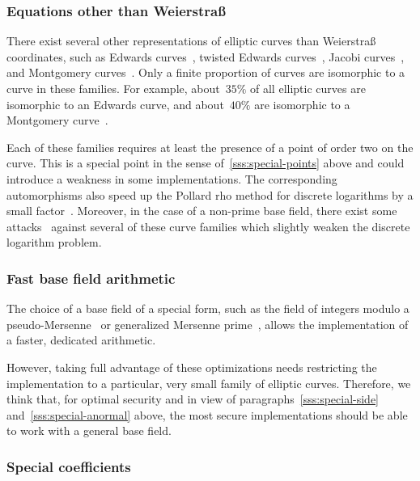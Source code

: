 \documentclass[twocolumn,letterpaper,10pt]{article}
\begin{document}
\subsubsection{Equations other than Weierstraß}
\label{sss:other-eq}

There exist several other representations of elliptic curves
than Weierstraß coordinates, such as
Edwards curves~\cite{ams2007edwards},
twisted Edwards curves~\cite{africa2008bbjl},
Jacobi curves~\cite{aaec2003bj},
and Montgomery curves~\cite{mc1987montgomery}.
Only a finite proportion of curves are isomorphic
to a curve in these families.
For example, about~$35\%$ of all elliptic curves
are isomorphic to an Edwards curve,
and about~$40\%$ are isomorphic to a Montgomery curve~\cite{sac2011plut}.

Each of these families requires at least
the presence of a point of order two on the curve.
This is a special point in the sense of~\ref{sss:special-points} above
and could introduce a weakness in some implementations.
The corresponding automorphisms also speed up the Pollard rho
method for discrete logarithms by a small factor~\cite{mc2000glv}.
Moreover, in the case of a non-prime base field,
there exist some attacks~\cite{jc2014fghr}
against several of these curve families
which slightly weaken the discrete logarithm problem.

\subsubsection{Fast base field arithmetic}
\label{sss:special-fast}

The choice of a base field of a special form,
such as the field of integers modulo
a pseudo-Mersenne~\cite{pkc2006bernstein}
or generalized Mersenne prime~\cite{nist2000fips186-2},
allows the implementation of a faster, dedicated arithmetic.

However, taking full advantage of these optimizations
needs restricting the implementation to a particular, very small
family of elliptic curves.
Therefore, we think that, for optimal security and in view of
paragraphs~\ref{sss:special-side} and~\ref{sss:special-anormal} above,
the most secure implementations should be able to work with
a general base field.

\subsubsection{Special coefficients}
\label{sss:special-coeff}
\end{document}

